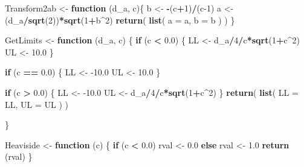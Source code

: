 \documentclass[
]{book}
\newenvironment{Shaded}{\begin{snugshade}}{\end{snugshade}}
\newcommand{\ControlFlowTok}[1]{\textcolor[rgb]{0.13,0.29,0.53}{\textbf{#1}}}
\newcommand{\DataTypeTok}[1]{\textcolor[rgb]{0.13,0.29,0.53}{#1}}
\newcommand{\DecValTok}[1]{\textcolor[rgb]{0.00,0.00,0.81}{#1}}
\newcommand{\FloatTok}[1]{\textcolor[rgb]{0.00,0.00,0.81}{#1}}
\newcommand{\KeywordTok}[1]{\textcolor[rgb]{0.13,0.29,0.53}{\textbf{#1}}}
\newcommand{\NormalTok}[1]{#1}
\newcommand{\OperatorTok}[1]{\textcolor[rgb]{0.81,0.36,0.00}{\textbf{#1}}}
\newcommand{\StringTok}[1]{\textcolor[rgb]{0.31,0.60,0.02}{#1}}
\begin{document}
\begin{Shaded}
\begin{Highlighting}[]
\NormalTok{Transform2ab <-}\StringTok{ }\ControlFlowTok{function}\NormalTok{ (d_a, c)\{}
\NormalTok{  b <-}\StringTok{ }\OperatorTok{-}\NormalTok{(c}\OperatorTok{+}\DecValTok{1}\NormalTok{)}\OperatorTok{/}\NormalTok{(c}\DecValTok{-1}\NormalTok{)}
\NormalTok{  a <-}\StringTok{ }\NormalTok{(d_a}\OperatorTok{/}\KeywordTok{sqrt}\NormalTok{(}\DecValTok{2}\NormalTok{))}\OperatorTok{*}\KeywordTok{sqrt}\NormalTok{(}\DecValTok{1}\OperatorTok{+}\NormalTok{b}\OperatorTok{^}\DecValTok{2}\NormalTok{)}
  \KeywordTok{return}\NormalTok{( }\KeywordTok{list}\NormalTok{(}
    \DataTypeTok{a =}\NormalTok{ a,}
    \DataTypeTok{b =}\NormalTok{ b}
\NormalTok{  ) )}
\NormalTok{\}}

\NormalTok{GetLimits <-}\StringTok{ }\ControlFlowTok{function}\NormalTok{ (d_a, c)}
\NormalTok{\{}
  \ControlFlowTok{if}\NormalTok{ (c }\OperatorTok{<}\StringTok{ }\FloatTok{0.0}\NormalTok{) \{}
\NormalTok{    LL <-}\StringTok{  }\NormalTok{d_a}\OperatorTok{/}\DecValTok{4}\OperatorTok{/}\NormalTok{c}\OperatorTok{*}\KeywordTok{sqrt}\NormalTok{(}\DecValTok{1}\OperatorTok{+}\NormalTok{c}\OperatorTok{^}\DecValTok{2}\NormalTok{)}
\NormalTok{    UL <-}\StringTok{  }\FloatTok{10.0}
\NormalTok{  \}}
  
  \ControlFlowTok{if}\NormalTok{ (c }\OperatorTok{==}\StringTok{ }\FloatTok{0.0}\NormalTok{) }
\NormalTok{  \{}
\NormalTok{    LL  <-}\StringTok{  }\FloatTok{-10.0}
\NormalTok{    UL <-}\StringTok{  }\FloatTok{10.0}
\NormalTok{  \}}
  
  \ControlFlowTok{if}\NormalTok{ (c }\OperatorTok{>}\StringTok{ }\FloatTok{0.0}\NormalTok{) }
\NormalTok{  \{}
\NormalTok{    LL <-}\StringTok{  }\FloatTok{-10.0}
\NormalTok{    UL <-}\StringTok{  }\NormalTok{d_a}\OperatorTok{/}\DecValTok{4}\OperatorTok{/}\NormalTok{c}\OperatorTok{*}\KeywordTok{sqrt}\NormalTok{(}\DecValTok{1}\OperatorTok{+}\NormalTok{c}\OperatorTok{^}\DecValTok{2}\NormalTok{)}
\NormalTok{  \}}
  \KeywordTok{return}\NormalTok{( }\KeywordTok{list}\NormalTok{(}
    \DataTypeTok{LL =}\NormalTok{ LL,}
    \DataTypeTok{UL =}\NormalTok{ UL}
\NormalTok{  ) )}
  
\NormalTok{\}}



\NormalTok{Heaviside <-}\StringTok{ }\ControlFlowTok{function}\NormalTok{ (c)}
\NormalTok{\{}
  \ControlFlowTok{if}\NormalTok{ (c }\OperatorTok{<}\StringTok{ }\FloatTok{0.0}\NormalTok{) rval <-}\StringTok{  }\FloatTok{0.0} \ControlFlowTok{else}\NormalTok{ rval  <-}\StringTok{  }\FloatTok{1.0}
  \KeywordTok{return}\NormalTok{ (rval)}
\NormalTok{\}}


\end{Highlighting}
\end{Shaded}
\end{document}
